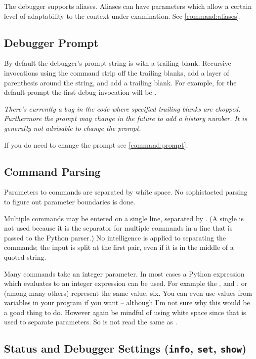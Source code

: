 The debugger supports aliases.  Aliases can have parameters which
allow a certain level of adaptability to the context under
examination. See \ref{command:aliases}.

\subsection{Debugger Prompt}\label{debugger:prompt}

By default the debugger's prompt string is  with 
a trailing blank. Recursive invocations using the
 command strip off the trailing blanks, add a layer of
parenthesis around the string, and add a trailing blank. For example,
for the default prompt the first debug invocation will be
.

\emph{There's currently a bug in the code where specified trailing
blanks are chopped. Furthermore the prompt may change in the future to
add a history number. It is generally not advisable to change the
prompt.}

If you do need to change the prompt see \ref{command:prompt}.

\subsection{Command Parsing}
Parameters to commands are separated by white space. No sophistacted
parsing to figure out parameter boundaries is done.

Multiple commands may be entered on a single line, separated by
\samp{;;}.  (A single \samp{;} is not used because it is the separator
for multiple commands in a line that is passed to the Python parser.)
No intelligence is applied to separating the commands; the input is
split at the first \samp{;;} pair, even if it is in the middle of a
quoted string.

Many commands take an integer parameter. In most cases a Python
expression which evaluates to an integer expression can be used. For
example the ,  and , or 
(among many others) represent the same value, six. You can even use
values from variables in your program if you want -- although I'm not
sure why this would be a good thing to do. However again be mindful of
using white space since that is used to separate parameters. So
 is not read the same as .

\subsection{Status and Debugger Settings ({\tt info}, {\tt set}, {\tt show})\label{subsection-status}}

